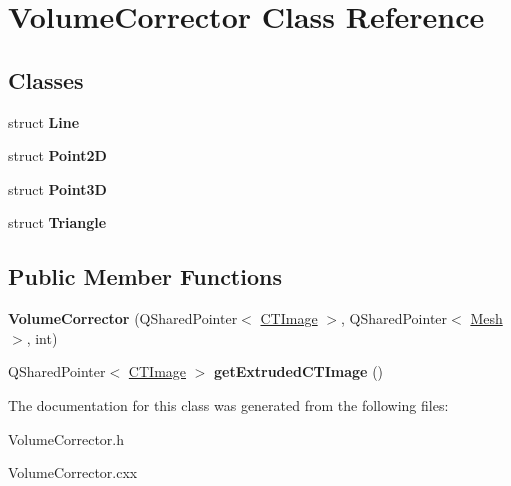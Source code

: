 \hypertarget{class_volume_corrector}{
\section{VolumeCorrector Class Reference}
\label{class_volume_corrector}
}
\subsection*{Classes}
\begin{DoxyCompactItemize}
\item 
struct {\bfseries Line}
\item 
struct {\bfseries Point2D}
\item 
struct {\bfseries Point3D}
\item 
struct {\bfseries Triangle}
\end{DoxyCompactItemize}
\subsection*{Public Member Functions}
\begin{DoxyCompactItemize}
\item 
\hypertarget{class_volume_corrector_ac6ac88360cc13aa7c24949cd00d7a975}{
{\bfseries VolumeCorrector} (QSharedPointer$<$ \hyperlink{class_c_t_image}{CTImage} $>$, QSharedPointer$<$ \hyperlink{class_mesh}{Mesh} $>$, int)}
\label{class_volume_corrector_ac6ac88360cc13aa7c24949cd00d7a975}

\item 
\hypertarget{class_volume_corrector_a9a5a8a001049e6013c4a376dea9da0ed}{
QSharedPointer$<$ \hyperlink{class_c_t_image}{CTImage} $>$ {\bfseries getExtrudedCTImage} ()}
\label{class_volume_corrector_a9a5a8a001049e6013c4a376dea9da0ed}

\end{DoxyCompactItemize}


The documentation for this class was generated from the following files:\begin{DoxyCompactItemize}
\item 
VolumeCorrector.h\item 
VolumeCorrector.cxx\end{DoxyCompactItemize}
